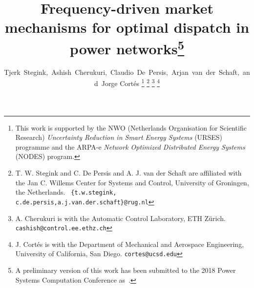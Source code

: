 \documentclass[journal]{IEEEtran}
\newcommand{\1}{\mathds 1}
\theoremstyle{remark}
\theoremstyle{definition}
\begin{document}

\title{Frequency-driven market mechanisms for optimal dispatch in
  power networks\thanks{A preliminary version of this work has been
    submitted to the 2018 Power Systems Computation Conference
    as~\cite{PSCC18-TS-AC-CDP-AS-JC}.}}



\author{Tjerk~Stegink,~Ashish~Cherukuri,~Claudio~De~Persis,~Arjan~van~der~Schaft,~and~Jorge
  Cort\'es%
  \thanks{This work is supported by the NWO (Netherlands Organisation
    for Scientific Research) \emph{Uncertainty Reduction in Smart
      Energy Systems} (URSES) programme and the ARPA-e \emph{Network
    Optimized Distributed Energy Systems} (NODES) program.}
  \thanks{T. W. Stegink and C. De Persis and A. J. van der Schaft are
    affiliated with the Jan C. Willems Center for Systems and Control,
    University of Groningen, the Netherlands.  {\tt\small
      \{t.w.stegink,
      c.de.persis,a.j.van.der.schaft\}@rug.nl}}%
  \thanks{A. Cherukuri is with the Automatic Control Laboratory, ETH
    Z\"{u}rich.  {\tt\small cashish@control.ee.ethz.ch}}
  \thanks{J. Cort\'es is with the Department of Mechanical and
    Aerospace Engineering, University of California, San Diego.
    {\tt\small cortes@ucsd.edu}} }%

% 
\end{document}
